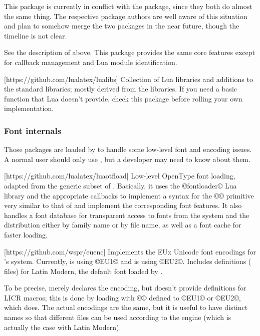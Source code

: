 \documentclass{lltxdoc}
\begin{document}
 This package is currently in conflict with the 
package, since they both do almost the same thing. The respective package
authors are well aware of this situation and plan to somehow merge the two
packages in the near future, though the timeline is not clear.

See the description of  above. This package provides the same
core features except for callback management and Lua module identification.

[https://github.com/lualatex/lualibs]
Collection of Lua libraries and additions to the standard libraries; mostly
derived from the \context libraries. If you need a basic function that Lua
doesn't provide, check this package before rolling your own implementation.

\subsubsection{Font internals}\label{fontint}

Those packages are loaded by  to handle some low-level font and
encoding issues. A normal user should only use , but a developer
may need to know about them.

[https://github.com/lualatex/luaotfload]
Low-level OpenType font loading, adapted from the generic subset of \context.
Basically, it uses the ©fontloader© Lua library and the appropriate callbacks
to implement a syntax for the ©\font© primitive very similar to that of \xetex
and implement the corresponding font features. It also handles a font database
for transparent access to fonts from the system and the \tex distribution
either by family name or by file name, as well as a font cache for faster
loading.

[https://github.com/wspr/euenc]
Implements the EUx Unicode font encodings for \latex's  system.
Currently, \xelatex is using ©EU1© and \lualatex is using ©EU2©. Includes
definitions ( files) for Latin Modern, the default font loaded by
.

To be precise,  merely declares the encoding, but
doesn't provide definitions for LICR macros; this is done by loading
 with ©\UTFencname© defined to ©EU1© or ©EU2©, which
 does. The actual encodings are the same, but it is useful to
have distinct names so that different  files can be used according to
the engine (which is actually the case with Latin Modern).
\end{document}
